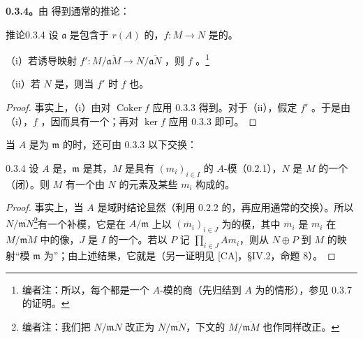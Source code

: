 \textbf{0.3.4。}由 得到通常的推论：
\begin{SGAresult}{推论}{0.3.4}
设 $\mathfrak a$ 是包含于 $r(A)$ 的，$f:M\to N$ 是的。

（i）若诱导映射 $f':M/\overline{\mathfrak aM}\to N/\overline{\mathfrak aN}$ ，则 $f$ 。\footnote{编者注：所以，每个都是一个 $A$-模的商（先归结到 $A$ 为的情形），参见 0.3.7 的证明。}

（ii）若 $N$ 是，则当 $f'$ 时 $f$ 也。
\end{SGAresult}
\begin{proof}
事实上，（i）由对 $\operatorname{Coker}f$ 应用 0.3.3 得到。对于（ii），假定 $f'$ 。于是由（i），$f$ ，因而具有一个；再对 $\ker f$ 应用 0.3.3 即可。
\end{proof}
当 $A$ 是为 $\mathfrak m$ 的时，还可由 0.3.3 以下交换：
\begin{SGAresult}{}{0.3.4}
设 $A$ 是，$\mathfrak m$ 是其，$M$ 是具有 $(m_i)_{i\in I}$ 的 $A$-模（0.2.1），$N$ 是 $M$ 的一个（闭）。则 $M$ 有一个由 $N$ 的元素及某些 $m_i$ 构成的。
\end{SGAresult}
\begin{proof}
事实上，当 $A$ 是域时结论显然（利用 0.2.2 的，再应用通常的交换）。所以 $N/\overline{\mathfrak mN}$\footnote{编者注：我们把 $N/\mathfrak mN$ 改正为 $N/\overline{\mathfrak mN}$，下文的 $M/\overline{\mathfrak mM}$ 也作同样改正。}有一个补模，它是在 $A/\mathfrak m$ 上以 $(\overline m_i)_{i\in J}$ 为的模，其中 $\overline m_i$ 是 $m_i$ 在 $M/\overline{\mathfrak mM}$ 中的像，$J$ 是 $I$ 的一个。若以 $P$ 记
$\prod_{i\in J}Am_i$，则从 $N\oplus P$ 到 $M$ 的映射“模 $\mathfrak m$ 为”；由上述结果，它就是（另一证明见 [CA]，\S IV.2，命题 8）。
\end{proof}

